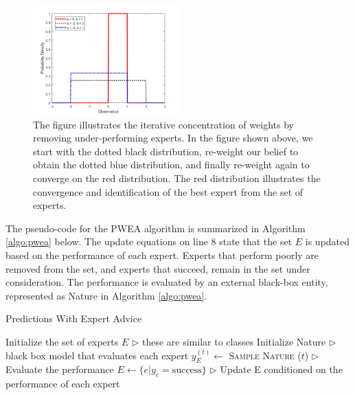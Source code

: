\documentclass[11pt]{article}
\begin{document}
\begin{figure}[ht]
    \centering
    \includegraphics[width=0.5\textwidth]{ContinuousUniformDistributionPdfExample_01.png}
    \caption{The figure illustrates the iterative concentration of weights by removing under-performing experts. In the figure shown above, we start with the dotted black distribution, re-weight our belief to obtain the dotted blue distribution, and finally re-weight again to converge on the red distribution. The red distribution illustrates the convergence and identification of the best expert from the set of experts.}
    \label{fig:weighting}
\end{figure}

The pseudo-code for the PWEA algorithm is summarized in Algorithm \ref{algo:pwea} below. The update equations on line 8 state that the set $E$ is updated based on the performance of each expert. Experts that perform poorly are removed from the set, and experts that succeed, remain in the set under consideration. The performance is evaluated by an external black-box entity, represented as Nature in Algorithm \ref{algo:pwea}. 

\begin{algorithm}[H]
\caption{Predictions With Expert Advice}
\label{algo:pwea}
\begin{algorithmic}[1]
\STATE Initialize the set of experts $E$ \hfill $\triangleright$ these are similar to classes
\STATE Initialize Nature \hfill $\triangleright$ black box model that evaluates each expert
    \STATE $y_{E}^{(t)}\leftarrow$ \textsc{Sample Nature} ($t$) \hfill $\triangleright$ Evaluate the performance
    \STATE $E\leftarrow \{e | y_{e} = \text{success}\} $ \hfill $\triangleright$ Update E conditioned on the performance of each expert
\ENDFOR

\end{algorithmic}
\end{algorithm}
\end{document}
